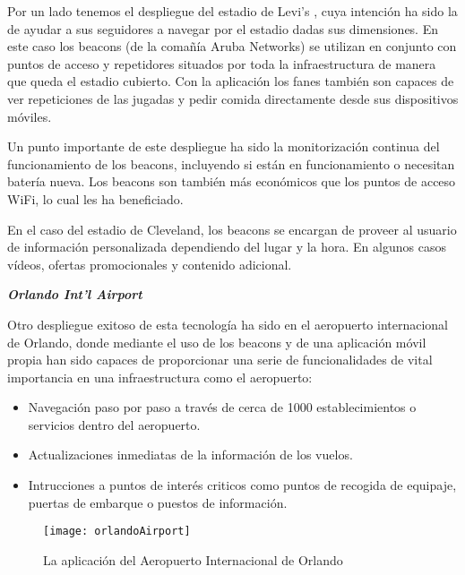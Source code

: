 Por un lado tenemos el despliegue del estadio de Levi's , cuya intención ha sido la de ayudar a sus seguidores a navegar por el estadio dadas sus dimensiones. En este caso los beacons (de la comañía Aruba Networks) se utilizan en conjunto con puntos de acceso y repetidores situados por toda la infraestructura de manera que queda el estadio cubierto. Con la aplicación los fanes también son capaces de ver repeticiones de las jugadas y pedir comida directamente desde sus dispositivos móviles.


Un punto importante de este  despliegue ha sido la monitorización continua del funcionamiento de los beacons, incluyendo si están en funcionamiento o necesitan batería nueva. Los beacons son también más económicos que los puntos de acceso WiFi, lo cual les ha beneficiado.

En el caso del estadio de Cleveland, los beacons se encargan de proveer al usuario de información personalizada dependiendo del lugar y la hora. En algunos casos vídeos, ofertas promocionales y contenido adicional.

\vspace{5mm}

\textsl{\textbf{{Orlando Int'l Airport}}}

\vspace{2mm}

Otro despliegue exitoso de esta tecnología ha sido en el aeropuerto internacional de Orlando, donde mediante el uso de los beacons y de una aplicación móvil propia han sido capaces de proporcionar una serie de funcionalidades de vital importancia en una infraestructura como el aeropuerto: 

\begin{itemize}
\item Navegación paso por paso a través de cerca de 1000 establecimientos o servicios dentro del aeropuerto. 
\item Actualizaciones inmediatas de la información de los vuelos. 
\item Intrucciones a puntos de interés criticos como puntos de recogida de equipaje, puertas de embarque o puestos de información.
\end{itemize}

\begin{figure}[H]
	\centering
	\texttt{[image: orlandoAirport]}
	\caption{La aplicación del Aeropuerto Internacional de Orlando}
	\label{fig:orlandoAirport}
\end{figure}

